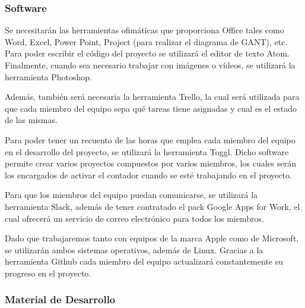 \subsubsection{Software}
\par{Se necesitarán las herramientas ofimáticas que proporciona Office tales como Word, Excel, Power Point, Project (para realizar el diagrama de GANT), etc. Para poder escribir el código del proyecto se utilizará el editor de texto Atom. Finalmente, cuando sea necesario trabajar con imágenes o vídeos, se utilizará la herramienta Photoshop.}
\par{Además, también será necesaria la herramienta Trello, la cual será utilizada para que cada miembro del equipo sepa qué tareas tiene asignadas y cual es el estado  de las mismas. }
\par{Para poder tener un recuento de las horas que emplea cada miembro del equipo en el desarrollo del proyecto, se utilizará la herramienta Toggl. Dicho software permite crear varios proyectos compuestos por varios miembros, los cuales serán los encargados de activar el contador cuando se esté trabajando en el proyecto.}
\par{Para que los miembros del equipo puedan comunicarse, se utilizará la herramienta Slack, además de tener contratado el pack Google Apps for Work, el cual ofrecerá un servicio de correo electrónico para todos los miembros. }
\par{Dado que trabajaremos tanto con equipos de la marca Apple como de Microsoft, se utilizarán ambos sistemas operativos, además de Linux. Gracias a la herramienta Github cada miembro del equipo actualizará constantemente su progreso en el proyecto.}

\subsubsection{Material de Desarrollo}
